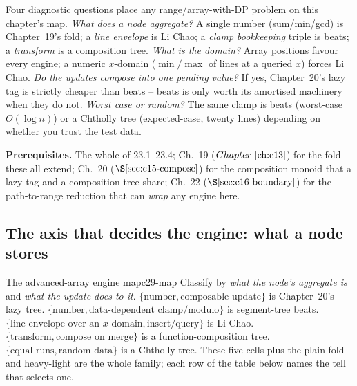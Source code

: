 \begin{topicintro}
Four diagnostic questions place any range/array-with-DP problem on this chapter's
map.  \emph{What does a node aggregate?} A single number (sum/min/gcd) is
Chapter~19's fold; a \emph{line envelope} is Li Chao; a \emph{clamp bookkeeping}
triple is beats; a \emph{transform} is a composition tree.  \emph{What is the
domain?} Array positions favour every engine; a numeric \(x\)-domain (\(\min/\max\)
of lines at a queried \(x\)) forces Li Chao.  \emph{Do the updates compose into one
pending value?} If yes, Chapter~20's lazy tag is strictly cheaper than beats --
beats is only worth its amortised machinery when they do not.  \emph{Worst case or
random?} The same clamp is beats (worst-case \(O(\log n)\)) or a Chtholly tree
(expected-case, twenty lines) depending on whether you trust the test data.

\textbf{Prerequisites.} The whole of 23.1--23.4; Ch.~19 (\(\chref{c13}\)) for the
fold these all extend; Ch.~20 (\(\secref{c15-compose}\)) for the composition monoid
that a lazy tag and a composition tree share; Ch.~22 (\(\secref{c16-boundary}\))
for the path-to-range reduction that can \emph{wrap} any engine here.
\end{topicintro}

\subsection{The axis that decides the engine: what a node stores}

\begin{definition}{The advanced-array engine map}{c29-map}
Classify by \emph{what the node's aggregate is} and \emph{what the update does to
it}.  \(\{\text{number}, \text{composable update}\}\) is Chapter~20's lazy tree.
\(\{\text{number}, \text{data-dependent clamp/modulo}\}\) is segment-tree beats.
\(\{\text{line envelope over an }x\text{-domain}, \text{insert/query}\}\) is Li
Chao.  \(\{\text{transform}, \text{compose on merge}\}\) is a function-composition
tree.  \(\{\text{equal-runs}, \text{random data}\}\) is a Chtholly tree.  These
five cells plus the plain fold and heavy-light are the whole family; each row of
the table below names the tell that selects one.
\end{definition}

